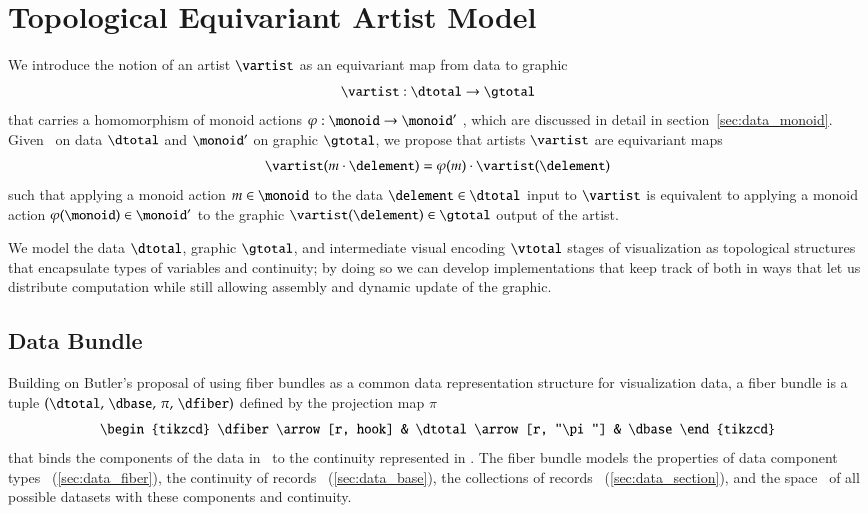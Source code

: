 \documentclass[journal]{vgtc}                %
\begin{document}
\section{Topological Equivariant Artist Model}
We introduce the notion of an artist $\mathscr{\vartist}$ as an equivariant map from data to graphic
\begin{equation}
    \label{eq:artist}
    \mathscr{\vartist}: \mathscr{\dtotal} \rightarrow \mathscr{\gtotal}
\end{equation}
that carries a homomorphism of monoid actions $\varphi: \monoid \rightarrow \monoid^{\prime}$ \cite{cegarraCohomologyMonoidsOperators2019}, which are discussed in detail in section~\ref{sec:data_monoid}. Given \monoid\ on data $\mathscr{\dtotal}$ and $\monoid^{\prime}$ on graphic $\mathscr{\gtotal}$, we propose that artists $\mathscr{\vartist}$ are equivariant maps 
\begin{equation}
\mathscr{\vartist}(m\cdot \delement) = \varphi(m)\cdot\mathscr{\vartist}(\delement) 
\end{equation}
such that applying a monoid action $m \in \monoid$ to the data $\delement \in \mathscr{\dtotal}$ input to $\mathscr{\vartist}$ is equivalent to applying a monoid action $\varphi(\monoid) \in \monoid^{\prime}$ to the graphic $\vartist(\delement) \in \mathscr{\gtotal}$ output of the artist.

We model the data $\mathscr{\dtotal}$, graphic $\mathscr{\gtotal}$, and intermediate visual encoding $\mathscr{\vtotal}$ stages of visualization as topological structures that encapsulate types of variables and continuity; by doing so we can develop implementations that keep track of both in ways that let us distribute computation while still allowing assembly and dynamic update of the graphic. 
\subsection{Data Bundle}
Building on Butler's proposal of using fiber bundles as a common data representation structure for visualization data\cite{butlerVectorBundleClassesForm1992, butlerVisualizationModelBased1989}, a fiber bundle is a tuple $(\dtotal,\,\dbase,\,\pi ,\,\dfiber)$ defined by the projection map $\pi$
\begin{equation}
    \label{eq:fiber_bundle}
    \begin{tikzcd}
        \dfiber \arrow[r, hook] & \dtotal \arrow[r, "\pi"] & \dbase
    \end{tikzcd}
\end{equation}
that binds the components of the data in \dfiber\ to the continuity represented in \dbase. The fiber bundle models the properties of data component types \dfiber\ (\ref{sec:data_fiber}), the continuity of records \dbase\ (\ref{sec:data_base}), the collections of records \dsection\ (\ref{sec:data_section}), and the space \dtotal\ of all possible datasets with these components and continuity. 
\end{document}
